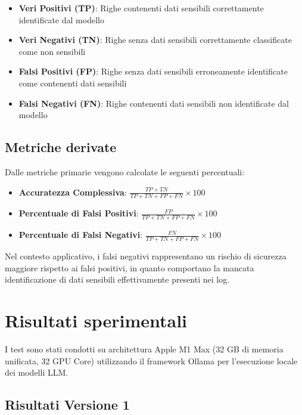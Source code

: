 \documentclass[12pt]{report}
\begin{document}
\begin{itemize}
    \item \textbf{Veri Positivi (TP)}: Righe contenenti dati sensibili correttamente identificate dal modello
    \item \textbf{Veri Negativi (TN)}: Righe senza dati sensibili correttamente classificate come non sensibili
    \item \textbf{Falsi Positivi (FP)}: Righe senza dati sensibili erroneamente identificate come contenenti dati sensibili
    \item \textbf{Falsi Negativi (FN)}: Righe contenenti dati sensibili non identificate dal modello
\end{itemize}

\subsection{Metriche derivate}
\label{subsec:metriche_derivate}

Dalle metriche primarie vengono calcolate le seguenti percentuali:

\begin{itemize}
    \item \textbf{Accuratezza Complessiva}: $\frac{TP + TN}{TP + TN + FP + FN} \times 100$
    \item \textbf{Percentuale di Falsi Positivi}: $\frac{FP}{TP + TN + FP + FN} \times 100$
    \item \textbf{Percentuale di Falsi Negativi}: $\frac{FN}{TP + TN + FP + FN} \times 100$
\end{itemize}

Nel contesto applicativo, i falsi negativi rappresentano un rischio di sicurezza maggiore rispetto ai falsi positivi, in quanto comportano la mancata identificazione di dati sensibili effettivamente presenti nei log.

\section{Risultati sperimentali}
\label{sec:risultati_sperimentali}

I test sono stati condotti su architettura Apple M1 Max (32 GB di memoria unificata, 32 GPU Core) utilizzando il framework Ollama per l'esecuzione locale dei modelli LLM.

\subsection{Risultati Versione 1}
\label{subsec:risultati_v1}
\end{document}
